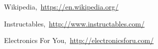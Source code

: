 \cleardoublepage
{}
{}
\begin{thebibliography}{99}

Wikipedia,\ \url{https://en.wikipedia.org/}

Instructables,\ \url{http://www.instructables.com/}

Electronics For You,\ \url{http://electronicsforu.com/}

\end{thebibliography}
